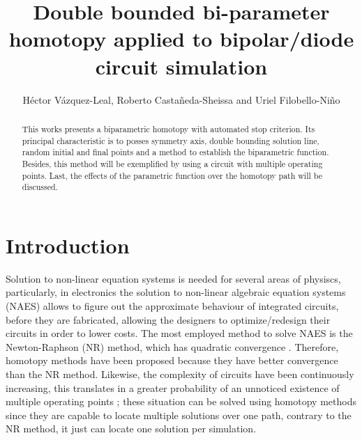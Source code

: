 \documentclass[conference,letterpaper,twocolumn]{IEEEtran}
\begin{document}
\title{Double bounded bi-parameter homotopy applied to bipolar/diode circuit simulation}

\author{\authorblockN\centerline{{H\'ector V\'azquez-Leal, Roberto Casta\~neda-Sheissa and Uriel Filobello-Niño }}
\and
{}
}

\maketitle

\begin{abstract}

This works presents a biparametric homotopy with automated stop criterion. Its principal characteristic is to posses symmetry axis, double bounding solution line, random initial and final points and a method to establish the biparametric function. Besides, this method will be exemplified by using a circuit with multiple operating points. Last, the effects of the parametric function over the homotopy path will be discussed.
\end{abstract}
 
\section{Introduction} 
Solution to non-linear equation systems is needed for several areas of physiscs, particularly, in electronics the solution to non-linear algebraic equation systems (NAES) allows to figure out the approximate behaviour of integrated circuits, before they are fabricated, allowing the designers to optimize/redesign their circuits in order to lower costs. The most employed method to solve NAES is the Newton-Raphson (NR) method, which has quadratic convergence \cite{homo_ogrodzki,cont_quasi}. Therefore, homotopy methods have been proposed because they have better convergence than the NR method. Likewise, the complexity of circuits have been continuously increasing, this translates in a greater probability of an unnoticed existence of multiple operating points \cite{netwth_4q}; these situation can be solved using homotopy methods since they are capable to locate multiple solutions over one path, contrary to the NR method, it just can locate one solution per simulation.
\end{document}
